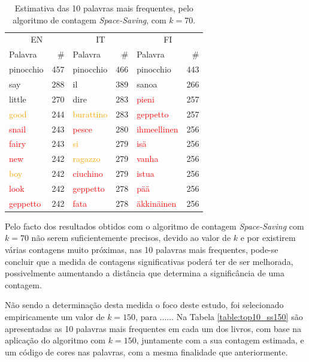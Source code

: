 \documentclass[mirror, portugues]{revdetua}
\begin{document}
\begin{table}[H]
\centering
\caption{Estimativa das 10 palavras mais frequentes, pelo algoritmo de contagem \textit{Space-Saving}, com $k = 70$.}
\label{table:top10_ss70}
\begin{tabular}{lr|lr|lr}
\toprule
\multicolumn{2}{c}{EN} & \multicolumn{2}{c}{IT} & \multicolumn{2}{c}{FI} \\
Palavra & \# & Palavra & \# & Palavra & \# \\
\midrule
pinocchio & 457 & pinocchio & 466 & pinocchio & 443 \\
say & 288 & il & 389 & sanoa & 266 \\
little & 270 & dire & 283 & \textcolor{red}{pieni} & 257 \\
\textcolor{orange}{good} & 244 & \textcolor{orange}{burattino} & 283 & \textcolor{red}{geppetto} & 257 \\
\textcolor{red}{snail} & 243 & \textcolor{red}{pesce} & 280 & \textcolor{red}{ihmeellinen} & 256 \\
\textcolor{red}{fairy} & 243 & \textcolor{orange}{si} & 279 & \textcolor{red}{isä} & 256 \\
\textcolor{red}{new} & 242 & \textcolor{orange}{ragazzo} & 279 & \textcolor{red}{vanha} & 256 \\
\textcolor{orange}{boy} & 242 & \textcolor{red}{ciuchino} & 279 & \textcolor{red}{istua} & 256 \\
\textcolor{red}{look} & 242 & \textcolor{red}{geppetto} & 278 & \textcolor{red}{pää} & 256 \\
\textcolor{red}{geppetto} & 242 & \textcolor{red}{fata} & 278 & \textcolor{red}{äkkinäinen} & 256 \\
\bottomrule
\end{tabular}
\end{table}

Pelo facto dos resultados obtidos com o algoritmo de contagem \textit{Space-Saving} com $k = 70$ não serem suficientemente precisos, devido ao valor de $k$ e por existirem várias contagens muito próximas, nas 10 palavras mais frequentes, pode-se concluir que a medida de contagens significativas poderá ter de ser melhorada, possivelmente aumentando a distância que determina a significância de uma contagem.

Não sendo a determinação desta medida o foco deste estudo, foi selecionado empiricamente um valor de $k = 150$, para ...... Na Tabela \ref{table:top10_ss150} são apresentadas as 10 palavras mais frequentes em cada um dos livros, com base na aplicação do algoritmo com $k = 150$, juntamente com a sua contagem estimada, e um código de cores nas palavras, com a mesma finalidade que anteriormente. %
\end{document}
